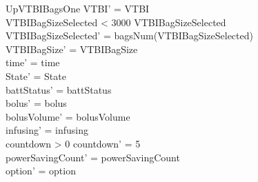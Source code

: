\begin{schema}{UpVTBIBagsOne}
	VTBI' = VTBI\\
	VTBIBagSizeSelected < 3000 \land VTBIBagSizeSelected \\
	VTBIBagSizeSelected' = bagsNum(VTBIBagSizeSelected)\\
	VTBIBagSize' = VTBIBagSize\\
	time' = time\\ State' = State\\
	battStatus' = battStatus\\
	bolus' = bolus\\
	bolusVolume' = bolusVolume\\
	infusing' = infusing\\
	countdown > 0 \land countdown' = 5\\
	powerSavingCount' = powerSavingCount\\ option' = option\\
\end{schema}

